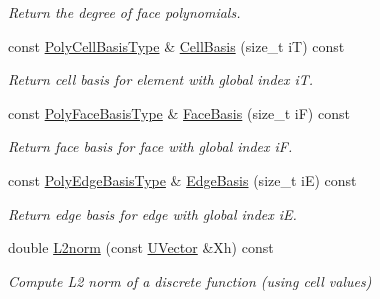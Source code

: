\begin{DoxyCompactItemize}
\begin{DoxyCompactList}\small\item\em Return the degree of face polynomials. \end{DoxyCompactList}\item 
\mbox{\label{classHArDCore3D_1_1HybridCore_afb3d4f37c8aef9a9b74f015bd2da41ea}} 
const \hyperlink{classHArDCore3D_1_1HybridCore_a5c478c9953257f154d2ea98f115fba0d}{Poly\+Cell\+Basis\+Type} \& \hyperlink{classHArDCore3D_1_1HybridCore_afb3d4f37c8aef9a9b74f015bd2da41ea}{Cell\+Basis} (size\+\_\+t iT) const
\begin{DoxyCompactList}\small\item\em Return cell basis for element with global index iT. \end{DoxyCompactList}\item 
\mbox{\label{classHArDCore3D_1_1HybridCore_a5db5bc8811abd5cb2a264486f61c0ad2}} 
const \hyperlink{classHArDCore3D_1_1HybridCore_ab02b7a4490b6a739e2d084e9a70dbcc5}{Poly\+Face\+Basis\+Type} \& \hyperlink{classHArDCore3D_1_1HybridCore_a5db5bc8811abd5cb2a264486f61c0ad2}{Face\+Basis} (size\+\_\+t iF) const
\begin{DoxyCompactList}\small\item\em Return face basis for face with global index iF. \end{DoxyCompactList}\item 
\mbox{\label{classHArDCore3D_1_1HybridCore_a21071e365011fbb477a70475f7642f02}} 
const \hyperlink{classHArDCore3D_1_1HybridCore_ad3123dceabd79eec7cdb57ba1014fc17}{Poly\+Edge\+Basis\+Type} \& \hyperlink{classHArDCore3D_1_1HybridCore_a21071e365011fbb477a70475f7642f02}{Edge\+Basis} (size\+\_\+t iE) const
\begin{DoxyCompactList}\small\item\em Return edge basis for edge with global index iE. \end{DoxyCompactList}\item 
double \hyperlink{classHArDCore3D_1_1HybridCore_ab37ab89bf946e237821dd978f475b7c8}{L2norm} (const \hyperlink{classHArDCore3D_1_1UVector}{U\+Vector} \&Xh) const
\begin{DoxyCompactList}\small\item\em Compute L2 norm of a discrete function (using cell values) \end{DoxyCompactList}\item 

\end{DoxyCompactItemize}
